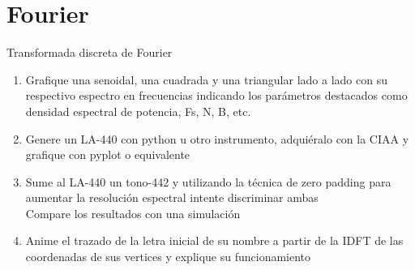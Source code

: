  \section{Fourier}
 \begin{frame}{Transformada discreta de Fourier}
    \begin{enumerate}
       \item{Grafique una senoidal, una cuadrada y una triangular lado a lado con su respectivo espectro en frecuencias indicando los parámetros destacados como densidad espectral de potencia, Fs, N, B, etc.} 
       \item{Genere un LA-440 con python u otro instrumento, adquiéralo con la CIAA y grafique con pyplot o equivalente}
       \item{Sume al LA-440 un tono-442 y utilizando la técnica de zero padding para aumentar la resolución espectral intente discriminar ambas \\ Compare los resultados con una simulación}
       \item{Anime el trazado de la letra inicial de su nombre a partir de la IDFT de las coordenadas de sus vertices y explique su funcionamiento}
    \end{enumerate}
 \end{frame}
